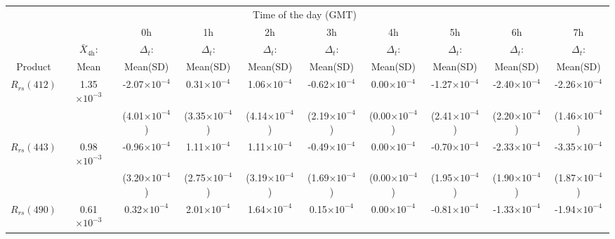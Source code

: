 \documentclass[preview]{standalone}
\begin{document}
\begin{threeparttable}
\scriptsize
\centering
\setlength\tabcolsep{1.5pt} %
\begin{tabular}{cccccccccc} \hline
   &   \multicolumn{8}{c}{Time of the day (GMT)}    \\ \cline{3-10}
& &    0h    & 1h  &  2h  &  3h  &  4h  &  5h  &  6h   &  7h   \\ 
   & $\bar{X}_{4\text{h}}$: &  $\Delta_t$:    & $\Delta_t$:  &  $\Delta_t$:  &  $\Delta_t$:  &  $\Delta_t$:  &  $\Delta_t$:  &  $\Delta_t$:   &  $\Delta_t$:  \\ 
Product & Mean\tnote{*}  &     Mean(SD)\tnote{*}    & Mean(SD)\tnote{*}  &  Mean(SD)\tnote{*}  &  Mean(SD)\tnote{*}  &  Mean(SD)\tnote{*}  &  Mean(SD)\tnote{*}  &  Mean(SD)\tnote{*}   &  Mean(SD)\tnote{*}  \\ \hline \hline 
$R_{rs}(412)$ & 1.35$\times10^{-3}$	&	 -2.07$\times10^{-4}$ 	&    0.31$\times10^{-4}$	&    1.06$\times10^{-4}$ 	&   -0.62$\times10^{-4}$ 	&    0.00$\times10^{-4}$ 	&   -1.27$\times10^{-4}$ 	&   -2.40$\times10^{-4}$ 	&   -2.26$\times10^{-4}$ 	\\
			  &						&	 (4.01$\times10^{-4}$) 	&   (3.35$\times10^{-4}$) 	&   (4.14$\times10^{-4}$) 	&   (2.19$\times10^{-4}$) 	&   (0.00$\times10^{-4}$) 	&   (2.41$\times10^{-4}$) 	&   (2.20$\times10^{-4}$) 	&   (1.46$\times10^{-4}$) 	\\ \hline
$R_{rs}(443)$ & 0.98$\times10^{-3}$	&	 -0.96$\times10^{-4}$ 	&    1.11$\times10^{-4}$ 	&    1.11$\times10^{-4}$ 	&   -0.49$\times10^{-4}$ 	&    0.00$\times10^{-4}$ 	&   -0.70$\times10^{-4}$ 	&   -2.33$\times10^{-4}$ 	&   -3.35$\times10^{-4}$ 	\\
			  &						&	 (3.20$\times10^{-4}$) 	&   (2.75$\times10^{-4}$) 	&   (3.19$\times10^{-4}$) 	&   (1.69$\times10^{-4}$) 	&   (0.00$\times10^{-4}$) 	&   (1.95$\times10^{-4}$) 	&   (1.90$\times10^{-4}$) 	&   (1.87$\times10^{-4}$) 	\\ \hline
$R_{rs}(490)$ & 0.61$\times10^{-3}$	&	  0.32$\times10^{-4}$ 	&    2.01$\times10^{-4}$ 	&    1.64$\times10^{-4}$ 	&    0.15$\times10^{-4}$ 	&    0.00$\times10^{-4}$ 	&   -0.81$\times10^{-4}$ 	&   -1.33$\times10^{-4}$ 	&   -1.94$\times10^{-4}$ 	\\

\end{tabular}
\end{threeparttable}
\end{document}
